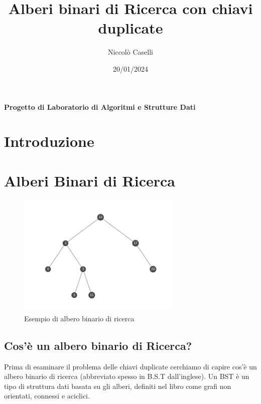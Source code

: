\documentclass{article}
\title{Alberi binari di Ricerca con chiavi duplicate}
\author{Niccolò Caselli}
\date{20/01/2024}
\begin{document}
\begin{titlepage}
  \maketitle
  \vspace*{\fill}
  \begin{center}
    \textbf{Progetto di Laboratorio di Algoritmi e Strutture Dati}
  \end{center}
  \vspace*{\fill}
\end{titlepage}


\renewcommand{\contentsname}{Indice} %
\tableofcontents
\newpage

\section{Introduzione}
\lipsum[1]


\section{Alberi Binari di Ricerca}

\begin{figure}[H]
  \centering
  \includegraphics[width=0.7\textwidth]{./images/bst-generic}
  \caption{Esempio di albero binario di ricerca}
  \label{fig:bst-generic}
\end{figure}



\subsection{Cos'è un albero binario di Ricerca?}
Prima di esaminare il problema delle chiavi duplicate cerchiamo di capire cos'è un albero binario di ricerca (abbreviato spesso in B.S.T dall'inglese).
Un BST è un tipo di struttura dati basata su gli alberi, definiti nel libro  \emph{} come grafi non orientati, connessi e aciclici. 
\end{document}
